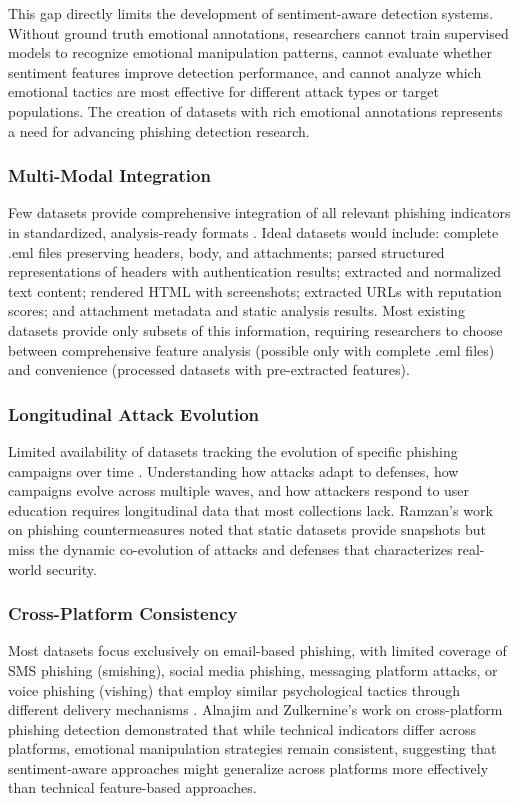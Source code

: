This gap directly limits the development of sentiment-aware detection systems. Without ground truth emotional annotations, researchers cannot train supervised models to recognize emotional manipulation patterns, cannot evaluate whether sentiment features improve detection performance, and cannot analyze which emotional tactics are most effective for different attack types or target populations. The creation of datasets with rich emotional annotations represents a need for advancing phishing detection research.

\subsubsection{Multi-Modal Integration}

Few datasets provide comprehensive integration of all relevant phishing indicators in standardized, analysis-ready formats \cite{oest2019phishfarm}. Ideal datasets would include: complete .eml files preserving headers, body, and attachments; parsed structured representations of headers with authentication results; extracted and normalized text content; rendered \ac{HTML} with screenshots; extracted URLs with reputation scores; and attachment metadata and static analysis results. Most existing datasets provide only subsets of this information, requiring researchers to choose between comprehensive feature analysis (possible only with complete .eml files) and convenience (processed datasets with pre-extracted features).

\subsubsection{Longitudinal Attack Evolution}

Limited availability of datasets tracking the evolution of specific phishing campaigns over time \cite{ramzan2010phishing}. Understanding how attacks adapt to defenses, how campaigns evolve across multiple waves, and how attackers respond to user education requires longitudinal data that most collections lack. Ramzan's work on phishing countermeasures noted that static datasets provide snapshots but miss the dynamic co-evolution of attacks and defenses that characterizes real-world security.

\subsubsection{Cross-Platform Consistency}

Most datasets focus exclusively on email-based phishing, with limited coverage of SMS phishing (smishing), social media phishing, messaging platform attacks, or voice phishing (vishing) that employ similar psychological tactics through different delivery mechanisms \cite{timko2023commercial}. Alnajim and Zulkernine's work on cross-platform phishing detection demonstrated that while technical indicators differ across platforms, emotional manipulation strategies remain consistent, suggesting that sentiment-aware approaches might generalize across platforms more effectively than technical feature-based approaches.

